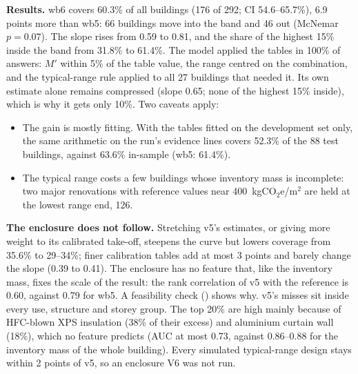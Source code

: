 \documentclass[10pt,letterpaper]{article}
\newcommand{\coe}{kgCO$_2$e/m$^2$}
\begin{document}
\textbf{Results.} wb6 covers 60.3\% of all buildings (176 of 292; CI 54.6--65.7\%), 6.9 points more than wb5: 66 buildings move into the band and 46 out (McNemar $p=0.07$). The slope rises from 0.59 to 0.81, and the share of the highest 15\% inside the band from 31.8\% to 61.4\%. The model applied the tables in 100\% of answers: $M'$ within 5\% of the table value, the range centred on the combination, and the typical-range rule applied to all 27 buildings that needed it. Its own estimate alone remains compressed (slope 0.65; none of the highest 15\% inside), which is why it gets only 10\%. Two caveats apply:
\begin{itemize}
\item The gain is mostly fitting. With the tables fitted on the development set only, the same arithmetic on the run's evidence lines covers 52.3\% of the 88 test buildings, against 63.6\% in-sample (wb5: 61.4\%).
\item The typical range costs a few buildings whose inventory mass is incomplete: two major renovations with reference values near 400~\coe{} are held at the lowest range end, 126.
\end{itemize}

\textbf{The enclosure does not follow.} Stretching v5's estimates, or giving more weight to its calibrated take-off, steepens the curve but lowers coverage from 35.6\% to 29--34\%; finer calibration tables add at most 3 points and barely change the slope (0.39 to 0.41). The enclosure has no feature that, like the inventory mass, fixes the scale of the result: the rank correlation of v5 with the reference is 0.60, against 0.79 for wb5. A feasibility check () shows why. v5's misses sit inside every use, structure and storey group. The top 20\% are high mainly because of HFC-blown XPS insulation (38\% of their excess) and aluminium curtain wall (18\%), which no feature predicts (AUC at most 0.73, against 0.86--0.88 for the inventory mass of the whole building). Every simulated typical-range design stays within 2 points of v5, so an enclosure V6 was not run.
\end{document}
